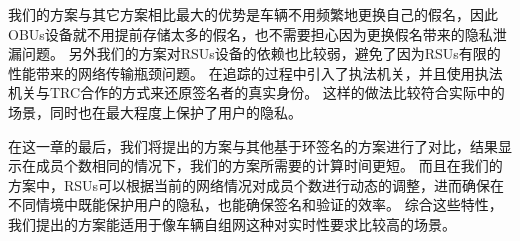 我们的方案与其它方案相比最大的优势是车辆不用频繁地更换自己的假名，因此OBUs设备就不用提前存储太多的假名，也不需要担心因为更换假名带来的隐私泄漏问题。
另外我们的方案对RSUs设备的依赖也比较弱，避免了因为RSUs有限的性能带来的网络传输瓶颈问题。
在追踪的过程中引入了执法机关，并且使用执法机关与TRC合作的方式来还原签名者的真实身份。
这样的做法比较符合实际中的场景，同时也在最大程度上保护了用户的隐私。

在这一章的最后，我们将提出的方案与其他基于环签名的方案进行了对比，结果显示在成员个数相同的情况下，我们的方案所需要的计算时间更短。
而且在我们的方案中，RSUs可以根据当前的网络情况对成员个数进行动态的调整，进而确保在不同情境中既能保护用户的隐私，也能确保签名和验证的效率。
综合这些特性，我们提出的方案能适用于像车辆自组网这种对实时性要求比较高的场景。